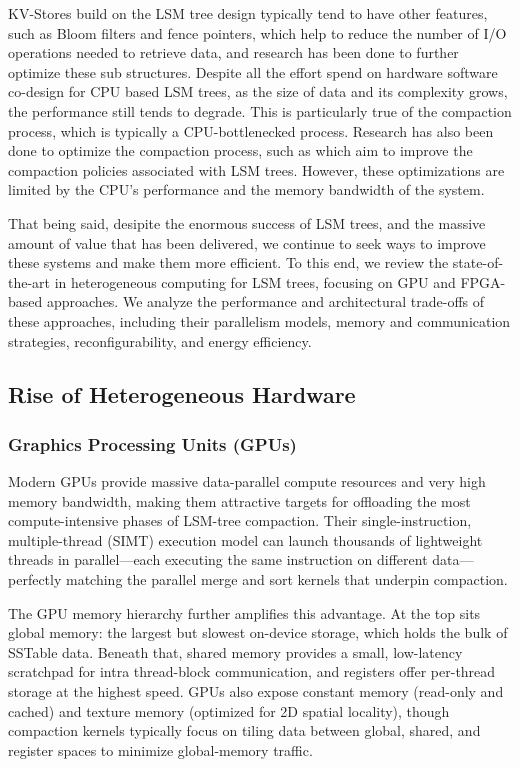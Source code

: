 \documentclass[sigconf]{acmart}
\begin{document}
    KV-Stores build on the LSM tree design typically tend to have other features, such as Bloom filters and fence pointers, which help to reduce the number of I/O operations needed to retrieve data, and research has been done to further optimize these sub structures.\cite{dayan2017monkey}
    Despite all the effort spend on hardware software co-design for CPU based LSM trees, as the size of data and its complexity grows, the performance still tends to degrade. This is particularly true of the compaction process, which is typically a CPU-bottlenecked process.
    Research has also been done to optimize the compaction process, such as \cite{dayan2018dostoevsky} \cite{dayan2019log} which aim to improve the compaction policies associated with LSM trees. However, these optimizations are limited by the CPU's performance and the memory bandwidth of the system.

    That being said, desipite the enormous success of LSM trees, and the massive amount of value that has been delivered, we continue to seek ways to improve these systems and make them more efficient. To this end, we review the state-of-the-art in heterogeneous computing for LSM trees, focusing on GPU and FPGA-based approaches. We analyze the performance and architectural trade-offs of these approaches, including their parallelism models, memory and communication strategies, reconfigurability, and energy efficiency.

  \subsection{Rise of Heterogeneous Hardware}

  \subsubsection{Graphics Processing Units (GPUs)}
  Modern GPUs provide massive data-parallel compute resources and very high memory bandwidth, making them attractive targets for offloading the most compute-intensive phases of LSM-tree compaction.
  Their single-instruction, multiple-thread (SIMT) execution model can launch thousands of lightweight threads in parallel—each executing the same instruction on different data—perfectly matching the parallel merge and sort kernels that underpin compaction.

  The GPU memory hierarchy further amplifies this advantage.  At the top sits global memory: the largest but slowest on-device storage, which holds the bulk of SSTable data.
  Beneath that, shared memory provides a small, low-latency scratchpad for intra thread-block communication, and registers offer per-thread storage at the highest speed.
  GPUs also expose constant memory (read-only and cached) and texture memory (optimized for 2D spatial locality), though compaction kernels typically focus on tiling data between global, shared, and register spaces to minimize global-memory traffic.
\end{document}
